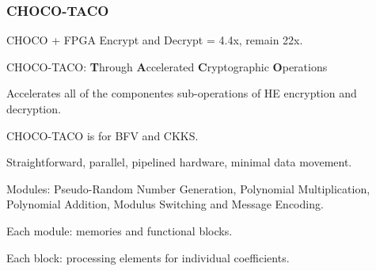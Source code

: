 \documentclass[10pt,handout]{beamer}
\begin{document}
\begin{frame}
\frametitle{CHOCO-TACO}
CHOCO + FPGA Encrypt and Decrypt = 4.4x, remain 22x.
    \vspace{-0.2cm}

    \pause
CHOCO-TACO: \textbf{T}hrough \textbf{A}ccelerated \textbf{C}ryptographic \textbf{O}perations
    \vspace{-0.2cm}

Accelerates all of the componentes sub-operations of HE encryption and decryption.
    \vspace{-0.2cm}

\pause
CHOCO-TACO is for BFV and CKKS.
    \vspace{-0.2cm}


 Straightforward, parallel, pipelined hardware, minimal data movement.
    \vspace{-0.2cm}

\pause

 Modules: Pseudo-Random Number Generation, Polynomial Multiplication, Polynomial Addition, Modulus Switching and Message Encoding.
    \vspace{-0.2cm}

 Each module: memories and functional blocks.
    \vspace{-0.2cm}

Each block: processing elements for individual coefficients.


\end{frame}

\end{document}
